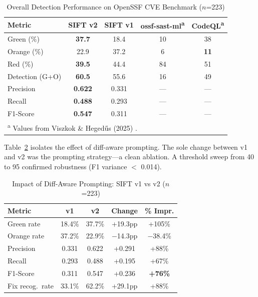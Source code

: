 \documentclass[conference]{IEEEtran}
\begin{document}
\begin{table}[htbp]
\caption{Overall Detection Performance on OpenSSF CVE Benchmark ($n$=223)}
\begin{center}
\begin{tabular}{|l|c|c|c|c|}
\hline
\textbf{Metric} & \textbf{SIFT v2} & \textbf{SIFT v1} & \textbf{ossf-sast-ml\textsuperscript{a}} & \textbf{CodeQL\textsuperscript{a}} \\
\hline
Green (\%) & \textbf{37.7} & 18.4 & 10 & 38 \\
\hline
Orange (\%) & 22.9 & 37.2 & 6 & \textbf{11} \\
\hline
Red (\%) & \textbf{39.5} & 44.4 & 84 & 51 \\
\hline
Detection (G+O) & \textbf{60.5} & 55.6 & 16 & 49 \\
\hline
Precision & \textbf{0.622} & 0.331 & --- & --- \\
\hline
Recall & \textbf{0.488} & 0.293 & --- & --- \\
\hline
F1-Score & \textbf{0.547} & 0.311 & --- & --- \\
\hline
\multicolumn{5}{l}{\textsuperscript{a} Values from Viszkok \& Heged\H{u}s (2025) \cite{b5}.}
\end{tabular}
\label{tab_overall}
\end{center}
\end{table}

Table~\ref{tab_ablation} isolates the effect of diff-aware prompting. The sole change between v1 and v2 was the prompting strategy---a clean ablation. A threshold sweep from 40 to 95 confirmed robustness (F1 variance $<$ 0.014).

\begin{table}[htbp]
\caption{Impact of Diff-Aware Prompting: SIFT v1 vs v2 ($n$=223)}
\begin{center}
\begin{tabular}{|l|c|c|c|c|}
\hline
\textbf{Metric} & \textbf{v1} & \textbf{v2} & \textbf{Change} & \textbf{\% Impr.} \\
\hline
Green rate & 18.4\% & 37.7\% & +19.3pp & +105\% \\
\hline
Orange rate & 37.2\% & 22.9\% & $-$14.3pp & $-$38.4\% \\
\hline
Precision & 0.331 & 0.622 & +0.291 & +88\% \\
\hline
Recall & 0.293 & 0.488 & +0.195 & +67\% \\
\hline
F1-Score & 0.311 & 0.547 & +0.236 & \textbf{+76\%} \\
\hline
Fix recog.\ rate & 33.1\% & 62.2\% & +29.1pp & +88\% \\
\hline
\end{tabular}
\label{tab_ablation}
\end{center}
\end{table}
\end{document}
